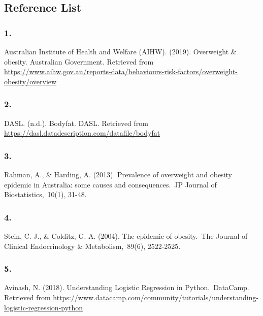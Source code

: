 \documentclass[a4paper,9pt,twocolumn,twoside,]{pinp}
\begin{document}
\newpage

\hypertarget{reference-list}{%
\subsection{Reference List}\label{reference-list}}

\hypertarget{section}{%
\subsubsection{1.}\label{section}}

Australian Institute of Health and Welfare (AIHW). (2019). Overweight \&
obesity. Australian Government. Retrieved from
\url{https://www.aihw.gov.au/reports-data/behaviours-risk-factors/overweight-obesity/overview}

\hypertarget{section-1}{%
\subsubsection{2.}\label{section-1}}

DASL. (n.d.). Bodyfat. DASL. Retrieved from
\url{https://dasl.datadescription.com/datafile/bodyfat}

\hypertarget{section-2}{%
\subsubsection{3.}\label{section-2}}

Rahman, A., \& Harding, A. (2013). Prevalence of overweight and obesity
epidemic in Australia: some causes and consequences.~JP Journal of
Biostatistics,~10(1), 31-48.

\hypertarget{section-3}{%
\subsubsection{4.}\label{section-3}}

Stein, C. J., \& Colditz, G. A. (2004). The epidemic of obesity.~The
Journal of Clinical Endocrinology \& Metabolism,~89(6), 2522-2525.

\hypertarget{section-4}{%
\subsubsection{5.}\label{section-4}}

Avinash, N. (2018). Understanding Logistic Regression in
Python.~DataCamp. Retrieved from
\url{https://www.datacamp.com/community/tutorials/understanding-logistic-regression-python}
\end{document}
